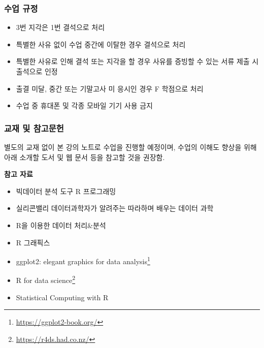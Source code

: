 \documentclass[
  11pt,
]{krantz}
\makeatletter
\providecommand{\tightlist}{%
  \setlength{\itemsep}{0pt}\setlength{\parskip}{0pt}}
\renewcommand{\href}[2]{#2\footnote{\url{#1}}}
\newenvironment{kframe}{%
\medskip{}
\setlength{\fboxsep}{.8em}
 \def\at@end@of@kframe{}%
 \ifinner\ifhmode%
  \def\at@end@of@kframe{\end{minipage}}%
  \begin{minipage}{\columnwidth}%
 \fi\fi%
 \def\FrameCommand##1{\hskip\@totalleftmargin \hskip-\fboxsep
 \colorbox{shadecolor}{##1}\hskip-\fboxsep
     \hskip-\linewidth \hskip-\@totalleftmargin \hskip\columnwidth}%
 \MakeFramed {\advance\hsize-\width
   \@totalleftmargin\z@ \linewidth\hsize
   \@setminipage}}%
 {\par\unskip\endMakeFramed%
 \at@end@of@kframe}
\renewenvironment{quote}{\begin{kframe}}{\end{kframe}}
\makeatother
\begin{document}
\hypertarget{policy-course}{%
\subsubsection*{수업 규정}\label{policy-course}}


\begin{quote}
\begin{itemize}
\tightlist
\item
  3번 지각은 1번 결석으로 처리
\item
  특별한 사유 없이 수업 중간에 이탈한 경우 결석으로 처리
\item
  특별한 사유로 인해 결석 또는 지각을 할 경우 사유를 증빙할 수 있는 서류 제출 시 출석으로 인정
\item
  출결 미달, 중간 또는 기말고사 미 응시인 경우 F 학점으로 처리
\item
  수업 중 휴대폰 및 각종 모바일 기기 사용 금지
\end{itemize}
\end{quote}

\hypertarget{material-course}{%
\subsubsection*{교재 및 참고문헌}\label{material-course}}


\begin{quote}
별도의 교재 없이 본 강의 노트로 수업을 진행할 예정이며, 수업의 이해도 향상을 위해 아래 소개할 도서 및 웹 문서 등을 참고할 것을 권장함.
\end{quote}

\textbf{참고 자료}

\begin{itemize}
\tightlist
\item
  빅데이터 분석 도구 R 프로그래밍 \citep{noman-2012}
\item
  실리콘밸리 데이터과학자가 알려주는 따라하며 배우는 데이터 과학 \citep{kwon-2017}
\item
  R을 이용한 데이터 처리\&분석 \citep{seo-2014}
\item
  R 그래픽스 \citep{ryu-2005}
\item
  \href{https://ggplot2-book.org/}{ggplot2: elegant graphics for data analysis} \citep{wickham-2016}
\item
  \href{https://r4ds.had.co.nz/}{R for data science} \citep{wickham-2016r}
\item
  Statistical Computing with R \citep{rizzo-2019}
\end{itemize}
\end{document}
